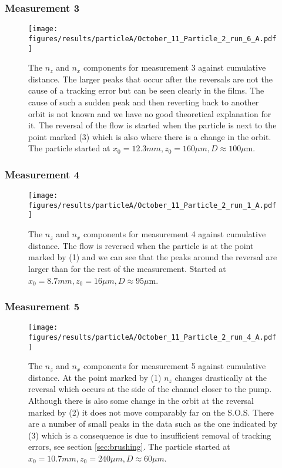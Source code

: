 \subsubsection{Measurement 3}
\begin{figure}[H]
\begin{center}
\texttt{[image: figures/results/particleA/October\_11\_Particle\_2\_run\_6\_A.pdf]}
\end{center}
\caption{The $n_z$ and $n_x$ components for measurement 3 against cumulative distance. The larger peaks that occur after the reversals are not the cause of a tracking error but can be seen clearly in the films. The cause of such a sudden peak and then reverting back to another orbit is not known and we have no good theoretical explanation for it. The reversal of the flow is started when the particle is next to the point marked (3) which is also where there is a change in the orbit. The particle started at $ x_0 = 12.3 mm, z_0 = 160 \mu m, D \approx 100\mu$m. }
\label{fig:particleA3}
\end{figure}



\subsubsection{Measurement 4}
\begin{figure}[H]
\begin{center}
\texttt{[image: figures/results/particleA/October\_11\_Particle\_2\_run\_1\_A.pdf]}
\end{center}
\caption{The $n_z$ and $n_x$ components for measurement 4 against cumulative distance. The flow is reversed when the particle is at the point marked by (1) and we can see that the peaks around the reversal are larger than for the rest of the measurement. Started at $x_0 = 8.7 mm, z_0 = 16\mu m, D \approx 95\mu$m.}
\label{fig:particleA4}
\end{figure}

\subsubsection{Measurement 5}
\begin{figure}[H]
\centering
\texttt{[image: figures/results/particleA/October\_11\_Particle\_2\_run\_4\_A.pdf]}
\caption{The $n_z$ and $n_x$ components for measurement 5 against cumulative distance. At the point marked by (1) $n_z$ changes drastically at the reversal which occurs at the side of the channel closer to the pump. Although there is also some change in the orbit at the reversal marked by (2) it does not move comparably far on the S.O.S. There are a number of small peaks in the data such as the one indicated by (3) which is a consequence is due to insufficient removal of tracking errors, see section \ref{sec:brushing}. The particle started at $x_0 = 10.7 mm, z_0 = 240 \mu m, D \approx 60\mu m$.}
\label{fig:particleA5}
\end{figure}

